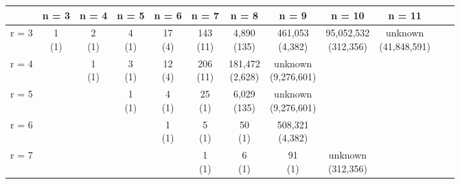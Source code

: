 \documentclass{article}
\begin{document}
\begin{table}[h]
\begin{center}
\scalebox{0.8}
{
\begin{tabular}{c | c | c | c | c | c | c | c | c | c | c | c |}
        & n = 3 & n = 4 & n = 5 & n = 6 & n = 7 & n = 8 & n = 9 & n = 10 & n = 11\\
 \hline
 r = 3  & \shortstack{1 \\ (1)}     &  \shortstack{2 \\ (1)}    &  \shortstack{4 \\ (1)}    &  \shortstack{17 \\ (4)}    &   \shortstack{143 \\ (11)}   &  \shortstack{4,890 \\ (135)}    &   \shortstack{461,053 \\ (4,382)}   & \shortstack{95,052,532 \\ (312,356)} & \shortstack{unknown \\ (41,848,591)} \\
 \hline 
 r = 4  &       &  \shortstack{1 \\ (1)}    &  \shortstack{3 \\ (1)}    &   \shortstack{12 \\ (4)}   &   \shortstack{206 \\ (11)}  & \shortstack{181,472 \\ (2,628)}   & \shortstack{unknown \\ (9,276,601)} & & \\
 \hline
 r = 5  &       &       &  \shortstack{1 \\ (1)}    &   \shortstack{4 \\ (1)}   &  \shortstack{25 \\ (1)}   & \shortstack{6,029 \\ (135)} & \shortstack{unknown \\ (9,276,601)} & & \\
 \hline
 r = 6  &       &       &        &  \shortstack{1 \\ (1)}   &  \shortstack{5 \\ (1)}    & \shortstack{50 \\ (1)}   & \shortstack{508,321 \\ (4,382)} & & \\
 \hline
 r = 7  &       &       &        &     &  \shortstack{1 \\ (1)}    & \shortstack{6 \\ (1)}   & \shortstack{91 \\ (1)} & \shortstack{unknown \\ (312,356)} & \\

\end{tabular}}
\end{center}
\end{table}
\end{document}
